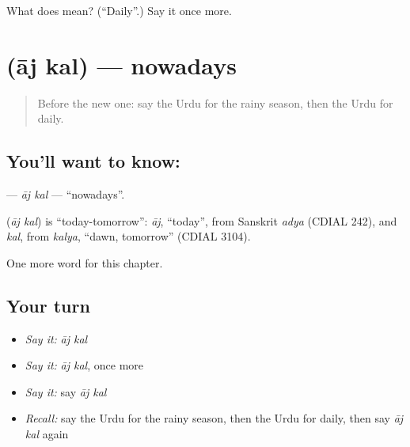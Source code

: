 \begin{tcolorbox}[breakable,colback=teal!4,colframe=teal!35!black,title={Before you move on}]
What does  mean? (\textquotedblleft{}Daily\textquotedblright{}.) Say it once more.
\end{tcolorbox}
\section[\texorpdfstring{\ur{آج} \ur{کل} (āj kal)}{آج کل (āj kal)}]{  (āj kal) — nowadays}

\label{lesson:UR-C245-aj-kal}



\begin{quote}
Before the new one: say the Urdu for the rainy season, then the Urdu for daily.
\end{quote}

\subsection*{You'll want to know:  }
\textbf{ } — \emph{āj kal} — \textquotedblleft{}nowadays\textquotedblright{}.

\begin{cousinweb}
\textbf{ } (\emph{āj kal}) is \textquotedblleft{}today-tomorrow\textquotedblright{}: \emph{āj}, \textquotedblleft{}today\textquotedblright{}, from Sanskrit \emph{adya} (CDIAL 242), and \emph{kal}, from \emph{kalya}, \textquotedblleft{}dawn, tomorrow\textquotedblright{} (CDIAL 3104).
\end{cousinweb}

\begin{grammarlens}[title={What you've built}]
One more word for this chapter.
\end{grammarlens}

\subsection*{Your turn}
\begin{itemize}
\raggedright
  \item \emph{Say it:} \emph{āj kal}
  \item \emph{Say it:} \emph{āj kal}, once more
  \item \emph{Say it:} say \emph{āj kal}
  \item \emph{Recall:} say the Urdu for the rainy season, then the Urdu for daily, then say \emph{āj kal} again
\end{itemize}

